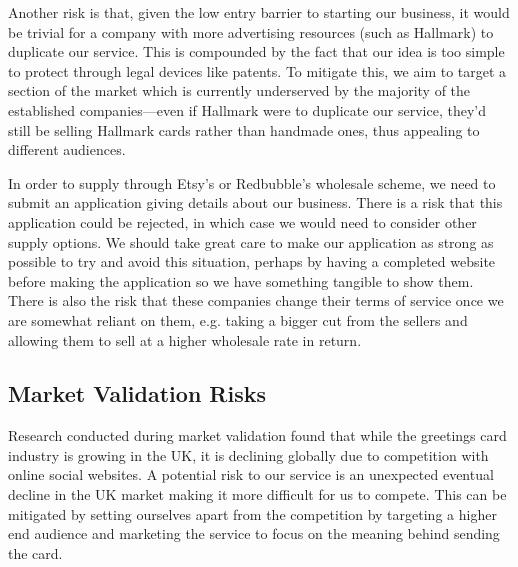 \documentclass[10pt,a4paper]{article}
\begin{document}
Another risk is that, given the low entry barrier to starting our business, it would be trivial for a company with more advertising resources (such as Hallmark) to duplicate our service. This is compounded by the fact that our idea is too simple to protect through legal devices like patents. To mitigate this, we aim to target a section of the market which is currently underserved by the majority of the established companies---even if Hallmark were to duplicate our service, they'd still be selling Hallmark cards rather than handmade ones, thus appealing to different audiences.

In order to supply through Etsy's or Redbubble's wholesale scheme, we need to submit an application giving details about our business. There is a risk that this application could be rejected, in which case we would need to consider other supply options. We should take great care to make our application as strong as possible to try and avoid this situation, perhaps by having a completed website before making the application so we have something tangible to show them. There is also the risk that these companies change their terms of service once we are somewhat reliant on them, e.g. taking a bigger cut from the sellers and allowing them to sell at a higher wholesale rate in return.

\subsection*{Market Validation Risks}
Research conducted during market validation found that while the greetings card industry is growing in the UK, it is declining globally due to competition with online social websites. A potential risk to our service is an unexpected eventual decline in the UK market making it more difficult for us to compete. This can be mitigated by setting ourselves apart from the competition by targeting a higher end audience and marketing the service to focus on the meaning behind sending the card.










\clearpage
\end{document}
